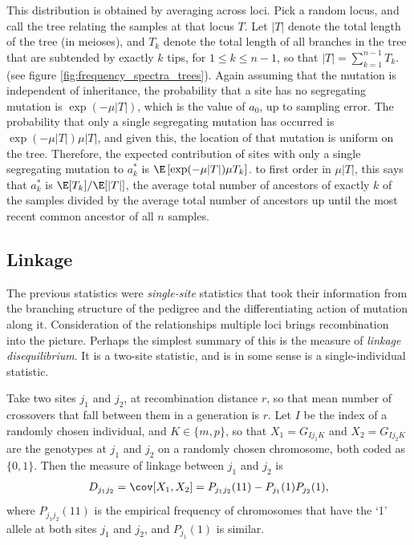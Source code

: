 This distribution is obtained by averaging across loci.
Pick a random locus, and call the tree relating the samples at that locus $T$.
Let $|T|$ denote the total length of the tree (in meioses),
and $T_k$ denote the total length of all branches in the tree that are subtended by exactly $k$ tips,
for $1 \le k \le n-1$, so that $|T| = \sum_{k=1}^{n-1} T_k$.
(see figure \ref{fig:frequency_spectra_trees}).
Again assuming that the mutation is independent of inheritance,
the probability that a site has no segregating mutation is
$\exp(-\mu |T|)$, which is the value of $a_0$, up to sampling error.
The probability that only a single segregating mutation has occurred is $\exp(-\mu |T|) \mu |T|$,
and given this,
the location of that mutation is uniform on the tree.
Therefore, the expected contribution of sites with only a single segregating mutation
to $a_k^*$ is $\E\left[ \exp(-\mu |T|) \mu T_k \right]$.
to first order in $\mu |T|$, this says that $a_k^*$ is $\E[T_k]/\E[|T|]$,
the average total number of ancestors of exactly $k$ of the samples
divided by the average total number of ancestors up until the most recent common ancestor of all $n$ samples.



\subsection{Linkage}

The previous statistics were \emph{single-site} statistics
that took their information from the branching structure of the pedigree
and the differentiating action of mutation along it.
Consideration of the relationships multiple loci brings recombination into the picture.
Perhaps the simplest summary of this is the measure of \emph{linkage disequilibrium}.
It is a two-site statistic, and is in some sense is a single-individual statistic.

Take two sites $j_1$ and $j_2$, at recombination distance $r$,
so that mean number of crossovers that fall between them in a generation is $r$.
Let $I$ be the index of a randomly chosen individual, and $K \in \{m,p\}$,
so that $X_1 = G_{Ij_1K}$ and $X_2 = G_{Ij_2K}$ are the genotypes at $j_1$ and $j_2$ 
on a randomly chosen chromosome, both coded as $\{0,1\}$.
Then the measure of linkage between $j_1$ and $j_2$ is
\begin{align}
  D_{j_1 j_2} = \cov[ X_1, X_2 ] = P_{j_1 j_2}(11) - P_{j_1}(1) P_{j_2}(1) ,
\end{align}
where $P_{j_1 j_2}(11)$ is the empirical frequency of chromosomes that have the `1' allele at both sites $j_1$ and $j_2$,
and $P_{j_1}(1)$ is similar.

